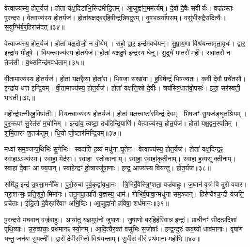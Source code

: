 वेत्वाज्य॑स्य॒ होत॒र्यज॑।
होता॑ यक्ष॒दिडा॑भि॒रिन्द्र॑मीडि॒तम्।
आ॒जुह्वा॑न॒मम॑र्त्यम्।
दे॒वो दे॒वैः सवीर्यः।
वज्र॑हस्तः पुरन्द॒रः।
वेत्वाज्य॑स्य॒ होत॒र्यज॑।
होता॑यक्षद्ब॒र्॒हिषीन्द्र॑न्निषद्व॒रम्।
वृ॒ष॒भन्नर्या॑पसम्।
वसु॑भीरु॒द्रैरा॑दि॒त्यैः।
स॒युग्भि॑र्ब॒र्॒हिरा\-स॑दत्॥३४॥

वेत्वाज्य॑स्य॒ होत॒र्यज॑।
होता॑ यक्ष॒दोजो॒ न वी॒र्यम्।
सहो॒ द्वार॒ इन्द्र॑मवर्धयन्।
सु॒प्रा॒य॒णा विश्र॑यन्तामृता॒वृधः॑।
द्वार॒ इन्द्रा॑य मी॒ढुषे।
वि॒यन्त्वाज्य॑स्य॒ होत॒र्यज॑।
होता॑ यक्षदु॒षे इन्द्र॑स्य धे॒नू।
सु॒दुघे॑ मा॒तरौ॑ म॒ही।
सवा॒तरौ॒ न तेज॑सी।
व॒थ्समिन्द्र॑मवर्धताम्॥३५॥

वी॒तामाज्य॑स्य॒ होत॒र्यज॑।
होता॑ यक्ष॒द्दैव्या॒ होता॑रा।
भि॒षजा॒ सखा॑या।
ह॒विषेन्द्रं॑ भिषज्यतः।
क॒वी दे॒वौ प्रचे॑तसौ।
इन्द्रा॑य धत्त इन्द्रि॒यम्।
वी॒तामाज्य॑स्य॒ होत॒र्यज॑।
होता॑ यक्षत्ति॒स्रो दे॒वीः।
त्रय॑स्त्रि॒धात॑वो॒पसः॑।
इडा॒ सर॑स्वती॒ भार॑ती॥३६॥

म॒हीन्द्र॑पत्नीर्‌\mbox{}ह॒विष्म॑तीः।
वि॒यन्त्वाज्य॑स्य॒ होत॒र्यज॑।
होता॑ यक्ष॒त्त्वष्टा॑र॒मिन्द्रं॑ दे॒वम्।
भि॒षजꣳ॑ सु॒यज॑ङ्घृत॒श्रियम्।
पु॒रु॒रूपꣳ॑ सु॒रेत॑सं म॒घोनिम्।
इन्द्रा॑य॒ त्वष्टा॒ दध॑दिन्द्रि॒याणि॑।
वेत्वाज्य॑स्य॒ होत॒र्यज॑।
होता॑ यक्ष॒द्वन॒स्पतिम्।
श॒मि॒तारꣳ॑ श॒तक्र॑तुम्।
धि॒यो जो॒ष्टार॑मिन्द्रि॒यम्॥३७॥

मध्वा॑ सम॒ञ्जन्प॒थिभिः॑ सु॒गेभिः॑।
स्वदा॑ति ह॒व्यं मधु॑ना घृ॒तेन॑।
वेत्वाज्य॑स्य॒ होत॒र्यज॑।
होता॑ यक्ष॒दिन्द्र॒ꣴ॒ स्वाहा\-ऽऽज्य॑स्य।
स्वाहा॒ मेद॑सः।
स्वाहा स्तो॒कानाम्।
स्वाहा॒ स्वाहा॑कृतीनाम्।
स्वाहा॑ ह॒व्यसूक्तीनाम्।
स्वाहा॑ दे॒वाꣳ आज्य॒पान्।
स्वाहेन्द्रꣳ॑ हो॒त्राज्जु॑षा॒णाः।
इन्द्र॒ आज्य॑स्य वियन्तु।
होत॒र्यज॑॥३८॥\anuvakamend[तेज॑सा\-ऽऽसददवर्धतां॒ भार॑तीन्द्रि॒यं जु॑षा॒णा द्वे च॑ (स॒मिधेन्द्र॒न्तनू॒नपा॑त॒मिडा॑भिर्ब॒र्॒हिष्योज॑ उ॒षे दैव्या॑ ति॒स्रस्त्वष्टा॑रं॒ वन॒स्पति॒मिन्द्रम्॥ स॒मिधेन्द्रं॑ च॒तुर्वेत्वेको॑ वि॒यन्तु॒ द्विर्वी॒तामेको॑ वि॒यन्तु॒ द्विर्वेत्वेको॑ वि॒यन्तु॒ होत॒र्यज॑॥)]

समि॑द्ध॒ इन्द्र॑ उ॒षसा॒मनी॑के।
पु॒रो॒रुचा॑ पूर्व॒कृद्वा॑वृधा॒नः।
त्रि॒भिर्दे॒वैस्त्रि॒ꣳ॒शता॒ वज्र॑बाहुः।
ज॒घान॑ वृ॒त्रं वि दुरो॑ ववार।
नरा॒शꣳसः॒ प्रति॒शूरो॒ मिमा॑नः।
तनू॒नपा॒त्प्रति॑ य॒ज्ञस्य॒ धाम॑।
गोभि॑र्व॒पावा॒न्मधु॑ना सम॒ञ्जन्।
हिर॑ण्यैश्च॒न्द्री य॑जति॒ प्रचे॑ताः।
ई॒डि॒तो दे॒वैर्‌\mbox{}हरि॑वाꣳ अभि॒ष्टिः।
आ॒जुह्वा॑नो ह॒विषा॒ शर्ध॑मानः॥३९॥

पु॒र॒न्द॒रो म॒घवा॒न् वज्र॑बाहुः।
आया॑तु य॒ज्ञमुप॑नो जुषा॒णः।
जु॒षा॒णो ब॒र्‌\mbox{}हिर्हरि॑वान्न॒ इन्द्रः॑।
प्रा॒चीनꣳ॑ सीदत्प्र॒दिशा॑ पृथि॒व्याः।
उ॒रु॒व्यचाः॒ प्रथ॑मानꣴ स्यो॒नम्।
आ॒दि॒त्यैर॒क्तं वसु॑भिः स॒जोषाः᳚।
इन्द्र॒न्दुरः॑ कव॒ष्यो॑ धाव॑मानाः।
वृषा॑णं यन्तु॒ जन॑यः सु॒पत्नीः᳚।
द्वारो॑ दे॒वीर॒भितो॒ विश्र॑यन्ताम्।
सु॒वीरा॑ वी॒रं प्रथ॑माना॒ महो॑भिः॥४०॥

